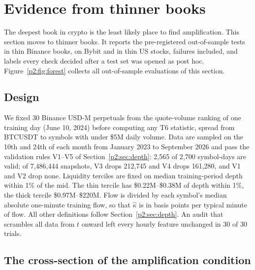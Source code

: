 \section{Evidence from thinner books}\label{p2:sec:thin}

The deepest book in crypto is the least likely place to find amplification. This section moves to thinner books. It reports the pre-registered out-of-sample tests in thin Binance books, on Bybit and in thin US stocks, failures included, and labels every check decided after a test set was opened as post hoc. Figure~\ref{p2:fig:forest} collects all out-of-sample evaluations of this section.

\subsection{Design}\label{p2:sec:thin_design}
We fixed 30 Binance USD-M perpetuals from the quote-volume ranking of one training day (June 10, 2024) before computing any T6 statistic, spread from BTCUSDT to symbols with under \$5M daily volume. Data are sampled on the 10th and 24th of each month from January 2023 to September 2026 and pass the validation rules V1--V5 of Section~\ref{p2:sec:depth}: 2{,}565 of 2{,}700 symbol-days are valid; of 7{,}486{,}444 snapshots, V3 drops 212{,}745 and V4 drops 161{,}280, and V1 and V2 drop none. Liquidity terciles are fixed on median training-period depth within 1\% of the mid. The thin tercile has \$0.22M--\$0.38M of depth within 1\%, the thick tercile \$0.97M--\$220M. Flow is divided by each symbol's median absolute one-minute training flow, so that $\hat\kappa$ is in basis points per typical minute of flow. All other definitions follow Section~\ref{p2:sec:depth}. An audit that scrambles all data from $t$ onward left every hourly feature unchanged in 30 of 30 trials.

\subsection{The cross-section of the amplification condition}

